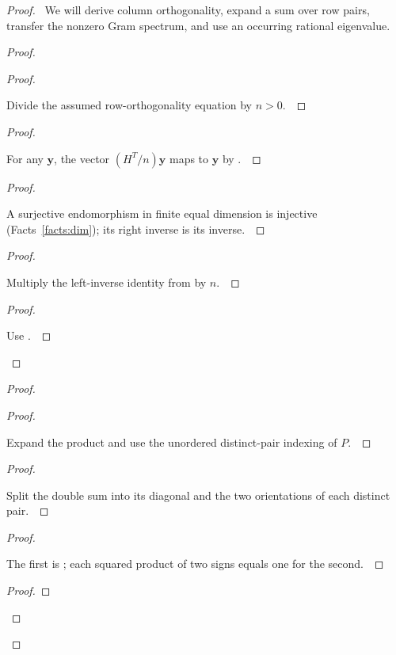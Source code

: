 \documentclass[11pt]{amsart}
\let\qed\relax
\newcommand\Zy{{\mathbf y}}
\theoremstyle{definition}
\begin{document}
\begin{proof}
\pfsketch\ We will derive column orthogonality, expand a sum over row pairs, transfer the nonzero Gram spectrum, and use an occurring rational eigenvalue.
\begin{proof}
\begin{proof}
\pf\ \raggedright Divide the assumed row-orthogonality equation by $n>0$.~\qed
\end{proof}
\begin{proof}
\pf\ \raggedright For any $\Zy$, the vector $(H^T/n)\Zy$ maps to $\Zy$ by .~\qed
\end{proof}
\begin{proof}
\pf\ \raggedright A surjective endomorphism in finite equal dimension is injective (Facts~\ref{facts:dim}); its right inverse is its inverse.~\qed
\end{proof}
\begin{proof}
\pf\ \raggedright Multiply the left-inverse identity from  by $n$.~\qed
\end{proof}
\qedstep
\begin{proof}
\pf\ \raggedright Use .~\qed
\end{proof}
\end{proof}
\begin{proof}
\begin{proof}
\pf\ \raggedright Expand the product and use the unordered distinct-pair indexing of $P$.~\qed
\end{proof}
\begin{proof}
\pf\ \raggedright Split the double sum into its diagonal and the two orientations of each distinct pair.~\qed
\end{proof}
\begin{proof}
\pf\ \raggedright The first is ; each squared product of two signs equals one for the second.~\qed
\end{proof}
\begin{proof}

\end{proof}
\end{proof}
\end{proof}
\end{document}
